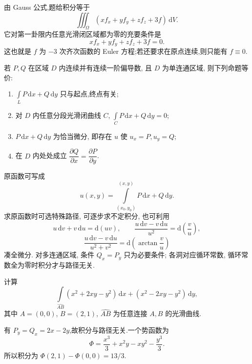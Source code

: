 \begin{solution}
    由 Gauss 公式,题给积分等于
    \[
        \displaystyle\iiint_\Omega\left(xf_x+yf_y+zf_z+3f\right)\,\mathrm{d}V.
    \]
    它对第一卦限内任意光滑闭区域都为零的充要条件是
    \[
        xf_x+yf_y+zf_z+3f=0.
    \]
    这也就是 $f$ 为 $-3$ 次齐次函数的 Euler 方程;若还要求在原点连续,则只能有 $f\equiv0$.
\end{solution}




\begin{theorem}[\markstar]
    若 $P,Q$ 在区域 $D$ 内连续并有连续一阶偏导数, 且 $D$ 为单连通区域, 则下列命题等价:
    \begin{enumerate}
        \item $\displaystyle\int\limits_LP\,\mathrm{d}x+Q\,\mathrm{d}y$ 只与起点,终点有关;
        \item 对 $D$ 内任意分段光滑闭曲线 $C$, $\displaystyle\int\limits_CP\,\mathrm{d}x+Q\,\mathrm{d}y=0$;
        \item $P\,\mathrm{d}x+Q\,\mathrm{d}y$ 为恰当微分, 即存在 $u$ 使 $u_x=P,u_y=Q$;
        \item 在 $D$ 内处处成立 $\dfrac{\partial Q}{\partial x}=\dfrac{\partial P}{\partial y}$.
    \end{enumerate}
\end{theorem}

\begin{remark}
    原函数可写成
    \[
        u(x,y)=\int\limits_{(x_0,y_0)}^{(x,y)}P\,\mathrm{d}x+Q\,\mathrm{d}y.
    \]
    求原函数时可选特殊路径, 可逐步求不定积分, 也可利用
    \[
        u\,\mathrm{d}v+v\,\mathrm{d}u=\mathrm{d}(uv),
        \qquad
        \dfrac{u\,\mathrm{d}v-v\,\mathrm{d}u}{u^2}=\mathrm{d}\left(\dfrac{v}{u}\right),
    \]
    \[
        \dfrac{u\,\mathrm{d}v-v\,\mathrm{d}u}{u^2+v^2}=\mathrm{d}\left(\arctan\dfrac{v}{u}\right)
    \]
    凑全微分. 对多连通区域, 条件 $Q_x=P_y$ 只为必要条件; 各洞对应循环常数, 循环常数全为零时积分才与路径无关.
\end{remark}

\begin{example}
    计算
    \[
        \displaystyle\int\limits_{\widehat{AB}}(x^2+2xy-y^2)\,\mathrm{d}x+(x^2-2xy-y^2)\,\mathrm{d}y,
    \]
    其中 $A=(0,0)$, $B=(2,1)$, $\widehat{AB}$ 为任意连接 $A,B$ 的光滑曲线.
\end{example}
\exampleblank

\begin{solution}
    有 $P_y=Q_x=2x-2y$,故积分与路径无关.一个势函数为
    \[
        \Phi=\dfrac{x^3}{3}+x^2y-xy^2-\dfrac{y^3}{3}.
    \]
    所以积分为 $\Phi(2,1)-\Phi(0,0)=13/3$.
\end{solution}

